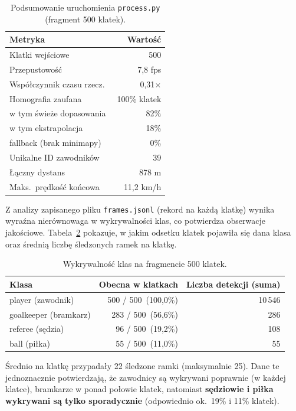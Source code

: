 \documentclass[11pt,a4paper]{article}
\begin{document}
\begin{table}[H]
\centering
\small
\caption{Podsumowanie uruchomienia \texttt{process.py} (fragment 500 klatek).}
\label{tab:proc}
\begin{tabular}{l r}
\toprule
Metryka & Wartość \\
\midrule
Klatki wejściowe          & 500 \\
Przepustowość             & 7,8 fps \\
Współczynnik czasu rzecz.\ & 0,31$\times$ \\
Homografia zaufana        & 100\% klatek \\
\quad w tym świeże dopasowania & 82\% \\
\quad w tym ekstrapolacja      & 18\% \\
\quad fallback (brak minimapy) & 0\% \\
Unikalne ID zawodników    & 39 \\
Łączny dystans            & 878 m \\
Maks.\ prędkość końcowa   & 11,2 km/h \\
\bottomrule
\end{tabular}
\end{table}

Z analizy zapisanego pliku \texttt{frames.jsonl} (rekord na każdą klatkę) wynika
wyraźna nierównowaga w wykrywalności klas, co potwierdza obserwacje jakościowe.
Tabela~\ref{tab:cls} pokazuje, w jakim odsetku klatek pojawiła się dana klasa
oraz średnią liczbę śledzonych ramek na klatkę.

\begin{table}[H]
\centering
\small
\caption{Wykrywalność klas na fragmencie 500 klatek.}
\label{tab:cls}
\begin{tabular}{l r r}
\toprule
Klasa & Obecna w klatkach & Liczba detekcji (suma) \\
\midrule
player (zawodnik)   & 500 / 500~(100,0\%) & 10\,546 \\
goalkeeper (bramkarz) & 283 / 500~(56,6\%) & 286 \\
referee (sędzia)    & 96 / 500~(19,2\%)   & 108 \\
ball (piłka)        & 55 / 500~(11,0\%)   & 55 \\
\bottomrule
\end{tabular}
\end{table}

Średnio na klatkę przypadały 22 śledzone ramki (maksymalnie 25). Dane te
jednoznacznie potwierdzają, że zawodnicy są wykrywani poprawnie
(w każdej klatce), bramkarze w ponad połowie klatek, natomiast
\textbf{sędziowie i piłka wykrywani są tylko sporadycznie} (odpowiednio ok.~19\%
i 11\% klatek).
\end{document}
